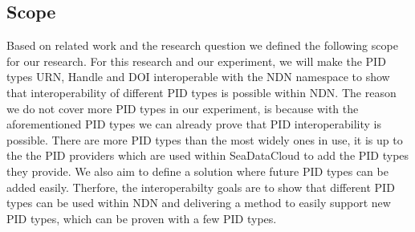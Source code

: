\subsection{Scope}


Based on related work and the research question we defined the following scope for our research. For this research and our experiment, we will make the PID types URN, Handle and DOI interoperable with the NDN namespace to show that interoperability of different PID types is possible within NDN.
The reason we do not cover more PID types in our experiment, is because with the aforementioned PID types we can already prove that PID interoperability is possible. There are more PID types than the most widely ones in use, it is up to the the PID providers which are used within SeaDataCloud to add the PID types they provide. We also aim to define a solution where future PID types can be added easily.
Therfore, the interoperabilty goals are to show that different PID types can be used within NDN and delivering a method to easily support new PID types, which can be proven with a few PID types.



